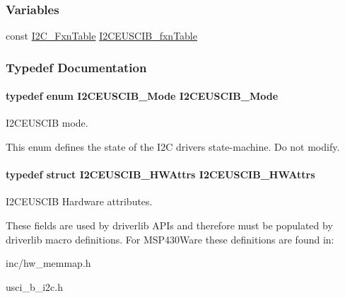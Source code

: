 \subsubsection*{Variables}
\begin{DoxyCompactItemize}
\item 
const \hyperlink{struct_i2_c___fxn_table}{I2\+C\+\_\+\+Fxn\+Table} \hyperlink{_i2_c_e_u_s_c_i_b_8h_aabe3af9e77a2b8cc7cd82dd22618e406}{I2\+C\+E\+U\+S\+C\+I\+B\+\_\+fxn\+Table}
\end{DoxyCompactItemize}


\subsubsection{Typedef Documentation}
\paragraph[{I2\+C\+E\+U\+S\+C\+I\+B\+\_\+\+Mode}]{\setlength{\rightskip}{0pt plus 5cm}typedef enum {\bf I2\+C\+E\+U\+S\+C\+I\+B\+\_\+\+Mode}  {\bf I2\+C\+E\+U\+S\+C\+I\+B\+\_\+\+Mode}}\label{_i2_c_e_u_s_c_i_b_8h_ab14ed18de4d94a4f4dd02b069949e331}


I2\+C\+E\+U\+S\+C\+I\+B mode. 

This enum defines the state of the I2\+C driver\textquotesingle{}s state-\/machine. Do not modify. 
\paragraph[{I2\+C\+E\+U\+S\+C\+I\+B\+\_\+\+H\+W\+Attrs}]{\setlength{\rightskip}{0pt plus 5cm}typedef struct {\bf I2\+C\+E\+U\+S\+C\+I\+B\+\_\+\+H\+W\+Attrs}  {\bf I2\+C\+E\+U\+S\+C\+I\+B\+\_\+\+H\+W\+Attrs}}\label{_i2_c_e_u_s_c_i_b_8h_ac186518a479ed39f3b2938dc44a72be5}


I2\+C\+E\+U\+S\+C\+I\+B Hardware attributes. 

These fields are used by driverlib A\+P\+Is and therefore must be populated by driverlib macro definitions. For M\+S\+P430\+Ware these definitions are found in\+:
\begin{DoxyItemize}
\item inc/hw\+\_\+memmap.\+h
\item usci\+\_\+b\+\_\+i2c.\+h
\end{DoxyItemize}

